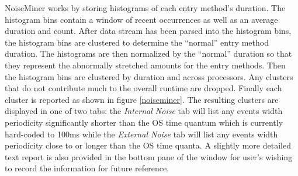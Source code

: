 NoiseMiner works by storing histograms of each entry method's duration. The histogram bins contain a window of recent occurrences as well as an average duration and count. After data stream has been parsed into the histogram bins, the histogram bins are clustered to determine the ``normal'' entry method duration. The histograms are then normalized by the ``normal'' duration so that they represent the abnormally stretched amounts for the entry methods. Then the histogram bins are clustered by duration and across processors. Any clusters that do not contribute much to the overall runtime are dropped. Finally each cluster is reported as shown in figure \ref{noiseminer}. The resulting clusters are displayed in one of two tabs: the \textit{Internal Noise} tab will list any events width periodicity significantly shorter than the OS time quantum which is currently hard-coded to 100ms while the \textit{External Noise} tab will list any events width periodicity close to or longer than the OS time quanta. A slightly more detailed text report is also provided in the bottom pane of the window for user's wishing to record the information for future reference.